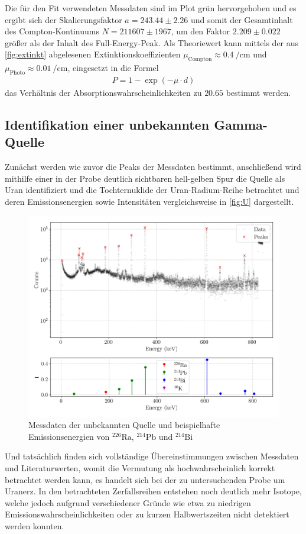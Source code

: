 Die für den Fit verwendeten Messdaten sind im Plot grün hervorgehoben und es ergibt sich der Skalierungsfaktor $a=243.44\pm2.26$ und somit der Gesamtinhalt des Compton-Kontinuums $N=211607 \pm 1967$, um den Faktor $2.209\pm0.022$ größer als der Inhalt des Full-Energy-Peak.
Als Theoriewert kann mittels der aus \autoref{fig:extinkt} abgelesenen Extinktionskoeffizienten $\mu_\text{Compton}\approx\SI{0.4}{\per\centi\meter}$ und $\mu_\text{Photo}\approx\SI{0.01}{\per\centi\meter}$, eingesetzt in die Formel
\begin{align*}
  P=1-\exp(-\mu\cdot d)
\end{align*}
das Verhältnis der Absorptionswahrscheinlichkeiten zu $20.65$ bestimmt werden.
\subsection{Identifikation einer unbekannten Gamma-Quelle}
Zunächst werden wie zuvor die Peaks der Messdaten bestimmt, anschließend wird mithilfe einer in der Probe deutlich sichtbaren hell-gelben Spur die Quelle als Uran identifiziert und die Tochternuklide der Uran-Radium-Reihe betrachtet und deren Emissionsenergien sowie Intensitäten vergleichsweise in \autoref{fig:U} dargestellt\cite{IAEA_Gamma_Energies}.
\begin{figure}[H]
  \centering
  \includegraphics[scale=0.65]{Skripte/Uran_with_emission_energies.png}
  \caption{Messdaten der unbekannten Quelle und beispielhafte Emissionsenergien von $^{226}\text{Ra}$, $^{214}\text{Pb}$ und $^{214}\text{Bi}$}
  \label{fig:U}
\end{figure}
Und tatsächlich finden sich vollständige Übereinstimmungen zwischen Messdaten und Literaturwerten, womit die Vermutung als hochwahrscheinlich korrekt betrachtet werden kann, es handelt sich bei der zu untersuchenden Probe um Uranerz.
In den betrachteten Zerfallsreihen entstehen noch deutlich mehr Isotope, welche jedoch aufgrund verschiedener Gründe wie etwa zu niedrigen Emissionswahrscheinlichkeiten oder zu kurzen Halbwertszeiten nicht detektiert werden konnten.